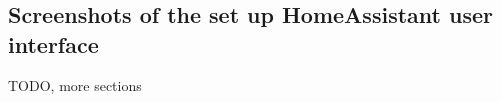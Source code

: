 \appendix
\chapter*{\fuggelek}
\setcounter{chapter}{\appendixnumber}



\section{Screenshots of the set up HomeAssistant user interface}
TODO, more sections %
